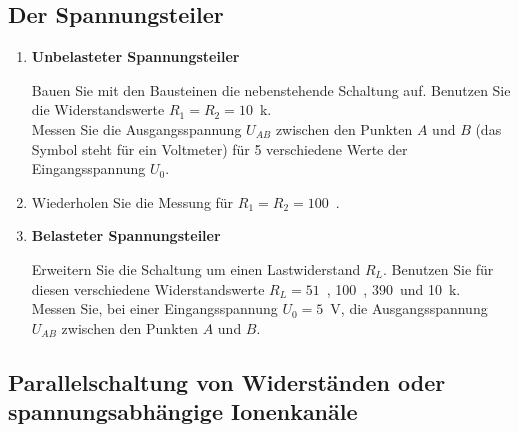 \subsection{Der Spannungsteiler}
\begin{enumerate}
	\item \textbf{Unbelasteter Spannungsteiler}\\
		\begin{minipage}{0.5\textwidth}
			Bauen Sie mit den Bausteinen die nebenstehende Schaltung auf. Benutzen Sie die Widerstandswerte $R_1=R_2=10$~k\Ohm.\\
			Messen Sie die Ausgangsspannung $U_{AB}$ zwischen den Punkten $A$ und $B$ (das Symbol steht für ein Voltmeter) für 5 verschiedene Werte der Eingangsspannung $U_0$.
		\end{minipage}
		\hfill
		\begin{minipage}{0.3\textwidth}
			
		\end{minipage}
	\item Wiederholen Sie die Messung für $R_1=R_2=100$~\Ohm.
	\item \textbf{Belasteter Spannungsteiler}\\	
		\begin{minipage}{0.5\textwidth}
			Erweitern Sie die Schaltung um einen Lastwiderstand $R_L$. Benutzen Sie für diesen verschiedene Widerstandswerte $R_L=51$~\Ohm, 100~\Ohm, 390~\Ohm und 10~k\Ohm.\\
			Messen Sie, bei einer Eingangsspannung $U_0=5$~V, die Ausgangsspannung $U_{AB}$ zwischen den Punkten $A$ und $B$.
		\end{minipage}
		\hfill
		\begin{minipage}{0.4\textwidth}
			
		\end{minipage}
\end{enumerate}

\subsection{Parallelschaltung von Widerständen oder spannungsabhängige Ionenkanäle}

